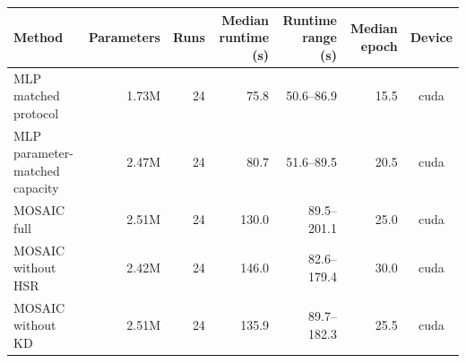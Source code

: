 \begin{tabular}{lrrrrrc}
\toprule
Method & Parameters & Runs & Median runtime (s) & Runtime range (s) & Median epoch & Device \\
\midrule
MLP matched protocol & 1.73M & 24 & 75.8 & 50.6--86.9 & 15.5 & cuda \\
MLP parameter-matched capacity & 2.47M & 24 & 80.7 & 51.6--89.5 & 20.5 & cuda \\
MOSAIC full & 2.51M & 24 & 130.0 & 89.5--201.1 & 25.0 & cuda \\
MOSAIC without HSR & 2.42M & 24 & 146.0 & 82.6--179.4 & 30.0 & cuda \\
MOSAIC without KD & 2.51M & 24 & 135.9 & 89.7--182.3 & 25.5 & cuda \\
\bottomrule
\end{tabular}
